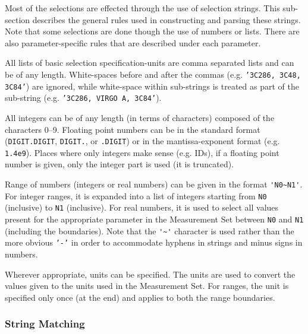 Most of the selections are effected through the use of selection
strings.  This sub-section describes the general rules used in
constructing and parsing these strings.  Note that some selections
are done though the use of numbers or lists.  There are also 
parameter-specific rules that are described under each parameter.

All lists of basic selection specification-units are comma separated
lists and can be of any length.  White-spaces before and after the
commas (e.g. {\tt '3C286, 3C48, 3C84'}) are ignored, while white-space 
within sub-strings is treated as part of the sub-string 
(e.g. {\tt '3C286, VIRGO A, 3C84'}).

All integers can be of any length (in terms of characters) composed of
the characters 0--9.  Floating point numbers can be in the standard
format ({\tt DIGIT.DIGIT}, {\tt DIGIT.}, or {\tt .DIGIT}) or in the 
mantissa-exponent format (e.g. {\tt 1.4e9}).  Places where only 
integers make sense (e.g. IDs), if a floating point number is given, 
only the integer part is used (it is truncated).

Range of numbers (integers or real numbers) can be given in the format
{\verb!'N0~N1'!}.  For integer ranges, it is expanded into a list of integers
starting from {\tt N0} (inclusive) to {\tt N1} (inclusive).  For real numbers, it
is used to select all values present for the appropriate parameter in
the Measurement Set between {\tt N0} and {\tt N1} (including the
boundaries).  Note that the {\verb!'~'!} character is used rather than the
more obvious {\tt '-'} in order to accommodate hyphens in strings and
minus signs in numbers.

Wherever appropriate, units can be specified.  The
units are used to convert the values given to the units used in the
Measurement Set.  For ranges, the unit is specified only once (at
the end) and applies to both the range boundaries.

\subsubsection{String Matching}
\label{section:io.selection.syntax.string}

